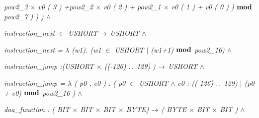\documentclass[11pt]{article}
\begin{document}
\begin{sloppypar}
\hspace*{1.00in}\it pow2\_3  $\times$  \it v0 \rm ( \rm 3 \rm ) \rm +\hspace*{0.15in}\it pow2\_2  $\times$  \it v0 \rm ( \rm 2 \rm ) \rm + \it pow2\_1  $\times$  \it v0 \rm ( \rm 1 \rm ) \rm + \it v0 \rm ( \rm 0 \rm ) \rm )  $\mod$  \it pow2\_7 \rm ) \rm ) \rm )  $\land$ \hspace*{0.15in}

\hspace*{0.20in}

\hspace*{0.20in}

\hspace*{0.20in}\it instruction\_next  $\in$  \it USHORT  $\fun$  \it USHORT  $\land$ 

\hspace*{0.20in}\it instruction\_next \rm =\hspace*{0.10in} $\lambda$  \rm (\it w1\rm )\rm . \rm (\it w1  $\in$  \it USHORT\hspace*{0.10in} $\mid$ \rm (\it w1\rm +\rm 1\rm )  $\mod$ \hspace*{0.10in}\it pow2\_16\hspace*{0.10in}\rm )  $\land$ 

\hspace*{0.20in}

\hspace*{0.20in}\it instruction\_jump \rm :\hspace*{0.10in}\rm (\it USHORT  $\times$  \rm (\rm (\rm -\rm 1\rm 2\rm 6\rm ) $\upto$ \rm 1\rm 2\rm 9\rm ) \rm )  $\fun$  \it USHORT  $\land$ 

\hspace*{0.20in}\it instruction\_jump \rm =  $\lambda$  \rm ( \it p0 \rm , \it e0 \rm ) \rm . \rm ( \it p0  $\in$  \it USHORT  $\land$  \it e0 \rm : \rm (\rm (\rm -\rm 1\rm 2\rm 6\rm ) $\upto$ \rm 1\rm 2\rm 9\rm )  $\mid$  \rm (\it p0 \rm + \it e0\rm )  $\mod$ \hspace*{0.10in}\it pow2\_16 \rm )\hspace*{0.10in} $\land$ 

\hspace*{0.20in}

\hspace*{0.20in}

\hspace*{0.20in}\it daa\_function \rm : \rm ( \it BIT  $\times$  \it BIT  $\times$  \it BIT  $\times$  \it BYTE\rm )  $\fun$  \rm ( \it BYTE  $\times$  \it BIT  $\times$  \it BIT \rm )  $\land$ 


\end{sloppypar}
\end{document}
